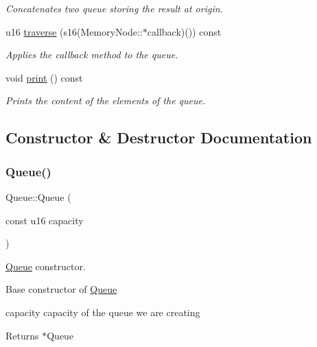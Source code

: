 \begin{DoxyCompactItemize}
\begin{DoxyCompactList}\small\item\em Concatenates two queue storing the result at origin. \end{DoxyCompactList}\item 
u16 \hyperlink{class_queue_a0e4e61a3568834e25b36625c883cbd38}{traverse} (s16(Memory\+Node\+::$\ast$callback)()) const
\begin{DoxyCompactList}\small\item\em Applies the callback method to the queue. \end{DoxyCompactList}\item 
void \hyperlink{class_queue_a5e5f86661785506b5de5f3e119ff871e}{print} () const
\begin{DoxyCompactList}\small\item\em Prints the content of the elements of the queue. \end{DoxyCompactList}\end{DoxyCompactItemize}


\subsection{Constructor \& Destructor Documentation}
\mbox{\label{class_queue_a2d54628be4dd884dca80d007cf80ae34}} 
\subsubsection{\texorpdfstring{Queue()}{Queue()}}
{\footnotesize\ttfamily Queue\+::\+Queue (\begin{DoxyParamCaption}\item[{const u16}]{capacity }\end{DoxyParamCaption})}



\hyperlink{class_queue}{Queue} constructor. 

Base constructor of \hyperlink{class_queue}{Queue}

capacity capacity of the queue we are creating \begin{DoxyReturn}{Returns}
$\ast$\+Queue 
\end{DoxyReturn}
\mbox{\label{class_queue_a00d119db8fa3050da37746e82cbcf94f}} 
